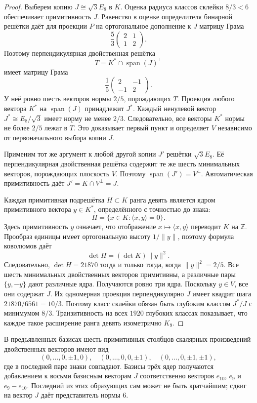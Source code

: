\begin{proof}
Выберем копию $J\cong\sqrt3E_8$ в $K$. Оценка радиуса классов
склейки $8/3<6$ обеспечивает примитивность $J$. Равенство в оценке
определителя бинарной решётки даёт для проекции $P$ на ортогональное
дополнение к $J$ матрицу Грама
\[
 \frac53\begin{pmatrix}2&1\\1&2\end{pmatrix}.
\]
Поэтому перпендикулярная двойственная решётка
\[
 T=K^*\cap\operatorname{span}(J)^\perp
\]
имеет матрицу Грама
\[
 \frac15\begin{pmatrix}2&-1\\-1&2\end{pmatrix}.
\]
У неё ровно шесть векторов нормы $2/5$, порождающих $T$.
Проекция любого вектора $K^*$ на $\operatorname{span}(J)$ принадлежит
$J^*$. Каждый ненулевой вектор $J^*\cong E_8/\sqrt3$ имеет норму
не менее $2/3$. Следовательно, все векторы $K^*$ нормы не более
$2/5$ лежат в $T$. Это доказывает первый пункт и определяет $V$
независимо от первоначального выбора копии $J$.

Применим тот же аргумент к любой другой копии $J'$ решётки
$\sqrt3E_8$. Её перпендикулярная двойственная решётка содержит те же
шесть минимальных векторов, порождающих плоскость $V$. Поэтому
$\operatorname{span}(J')=V^\perp$. Автоматическая примитивность даёт
$J'=K\cap V^\perp=J$.

Каждая примитивная подрешётка $H\subset K$ ранга девять является ядром
примитивного вектора $y\in K^*$, определённого с точностью до знака:
\[
 H=\{x\in K:\langle x,y\rangle=0\}.
\]
Здесь примитивность $y$ означает, что отображение
$x\mapsto\langle x,y\rangle$ переводит $K$ на $\mathbb Z$.
Прообраз единицы имеет ортогональную высоту $1/\|y\|$, поэтому
формула коволюмов даёт
\[
 \det H=(\det K)\|y\|^2.
\]
Следовательно, $\det H=21870$ тогда и только тогда, когда
$\|y\|^2=2/5$. Все шесть минимальных двойственных векторов
примитивны, а различные пары $\{y,-y\}$ дают различные ядра.
Получаются ровно три ядра. Поскольку $y\in V$, все они содержат $J$.
Их одномерная проекция перпендикулярно $J$ имеет квадрат шага
$21870/6561=10/3$. Поэтому класс склейки обязан быть глубоким
классом $J^*/J$ с минимумом $8/3$. Транзитивность на всех $1920$
глубоких классах показывает, что каждое такое расширение ранга девять
изометрично $K_9$.
\end{proof}

В предъявленных базисах шесть примитивных столбцов скалярных произведений
двойственных векторов имеют вид
\[
 (0,\ldots,0,\pm1,0),\quad
 (0,\ldots,0,0,\pm1),\quad
 (0,\ldots,0,\pm1,\pm1),
\]
где в последней паре знаки совпадают. Базисы трёх ядер получаются
добавлением к восьми базисным векторам $J$ соответственно векторов
$e_{10}$, $e_9$ и $e_9-e_{10}$. Последний из этих образующих сам
может не быть кратчайшим; сдвиг на вектор $J$ даёт представитель нормы $6$.

